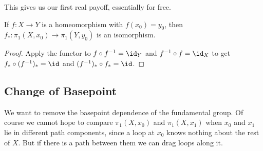 This gives us our first real payoff, essentially for free.

\begin{corollary} \label{cor:homeo-iso}
	If $f: X \to Y$ is a homeomorphism with $f(x_0) = y_0$, then $f_*: \pi_1(X,x_0) \to \pi_1(Y,y_0)$ is an isomorphism.
\end{corollary}
\begin{proof}
	Apply the functor to $f \circ f^{-1} = \id_Y$ and $f^{-1} \circ f = \id_X$ to get $f_* \circ (f^{-1})_* = \id$ and $(f^{-1})_* \circ f_* = \id$.
\end{proof}

\subsection{Change of Basepoint}

We want to remove the basepoint dependence of the fundamental group. Of course we cannot
hope to compare $\pi_1(X, x_0)$ and $\pi_1(X, x_1)$ when $x_0$ and $x_1$ lie in different
path components, since a loop at $x_0$ knows nothing about the rest of $X$. But if there
is a path between them we can drag loops along it.


